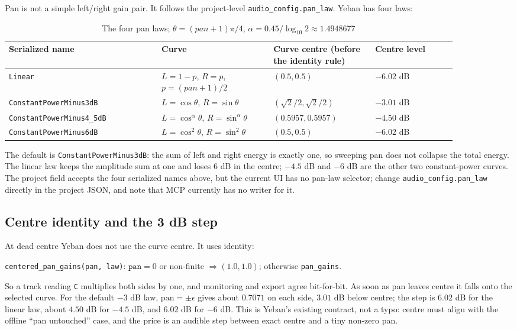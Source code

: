 Pan is not a simple left/right gain pair. It follows the project-level \texttt{audio\_config.pan\_law}. Yeban has four laws:

\begin{table}[htbp]
\centering
\small
\begin{tabular}{@{}p{0.30\linewidth}p{0.22\linewidth}p{0.20\linewidth}p{0.16\linewidth}@{}}
\hline
Serialized name & Curve & Curve centre (before the identity rule) & Centre level \\
\hline
\texttt{Linear} & $L=1-p$, $R=p$, $p=(pan+1)/2$ & $(0.5,0.5)$ & $-6.02$ dB \\
\texttt{ConstantPower\allowbreak Minus3dB} & $L=\cos\theta$, $R=\sin\theta$ & $(\sqrt2/2,\sqrt2/2)$ & $-3.01$ dB \\
\texttt{ConstantPower\allowbreak Minus4\_5dB} & $L=\cos^{\alpha}\theta$, $R=\sin^{\alpha}\theta$ & $(0.5957,0.5957)$ & $-4.50$ dB \\
\texttt{ConstantPower\allowbreak Minus6dB} & $L=\cos^2\theta$, $R=\sin^2\theta$ & $(0.5,0.5)$ & $-6.02$ dB \\
\hline
\end{tabular}
\caption{The four pan laws; $\theta=(pan+1)\pi/4$, $\alpha=0.45/\log_{10}2\approx1.4948677$}
\label{tab:pan-laws}
\end{table}

The default is \texttt{ConstantPower\allowbreak Minus3dB}: the sum of left and right energy is exactly one, so sweeping pan does not collapse the total energy. The linear law keeps the amplitude sum at one and loses 6 dB in the centre; $-4.5$ dB and $-6$ dB are the other two constant-power curves. The project field accepts the four serialized names above, but the current UI has no pan-law selector; change \texttt{audio\_config.pan\_law} directly in the project JSON, and note that MCP currently has no writer for it.

\subsection{Centre identity and the 3 dB step}

At dead centre Yeban does not use the curve centre. It uses identity:

\begin{center}
\texttt{centered\_pan\_gains(pan, law)}:\quad
$\texttt{pan}=0$ or non-finite $\Rightarrow (1.0,1.0)$; otherwise \texttt{pan\_gains}.
\end{center}

So a track reading \texttt{C} multiplies both sides by one, and monitoring and export agree bit-for-bit. As soon as pan leaves centre it falls onto the selected curve. For the default $-3$ dB law, $\mathrm{pan}=\pm\epsilon$ gives about $0.7071$ on each side, $3.01$ dB below centre; the step is $6.02$ dB for the linear law, about $4.50$ dB for $-4.5$ dB, and $6.02$ dB for $-6$ dB. This is Yeban's existing contract, not a typo: centre must align with the offline ``pan untouched'' case, and the price is an audible step between exact centre and a tiny non-zero pan.

